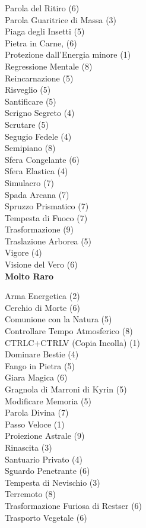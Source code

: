 \begin{multicols}{3}
{	Parola del Ritiro (6)\\
	Parola Guaritrice di Massa (3)\\
	Piaga degli Insetti (5)\\
	Pietra in Carne, (6)\\
	Protezione dall'Energia minore (1)\\
	Regressione Mentale (8)\\
	Reincarnazione (5)\\
	Risveglio (5)\\
	Santificare (5)\\
	Scrigno Segreto (4)\\
	Scrutare (5)\\
	Segugio Fedele (4)\\
	Semipiano (8)\\
	Sfera Congelante (6)\\
	Sfera Elastica (4)\\
	Simulacro (7)\\
	Spada Arcana (7)\\
	Spruzzo Prismatico (7)\\
	Tempesta di Fuoco (7)\\
	Trasformazione (9)\\
	Traslazione Arborea (5)\\
	Vigore (4)\\
	Visione del Vero (6)\\

	\medskip\textbf{Molto Raro}\medskip

	Arma Energetica (2)\\
	Cerchio di Morte (6)\\
	Comunione con la Natura (5)\\
	Controllare Tempo Atmosferico (8)\\
	CTRLC+CTRLV (Copia Incolla) (1)\\
	Dominare Bestie (4)\\
	Fango in Pietra (5)\\
	Giara Magica (6)\\
	Gragnola di Marroni di Kyrin (5)\\
	Modificare Memoria (5)\\
	Parola Divina (7)\\
	Passo Veloce (1)\\
	Proiezione Astrale (9)\\
	Rinascita (3)\\
	Santuario Privato (4)\\
	Sguardo Penetrante (6)\\
	Tempesta di Nevischio (3)\\
	Terremoto (8)\\
	Trasformazione Furiosa di Restser (6)\\
	Trasporto Vegetale (6)\\

}
\end{multicols}
